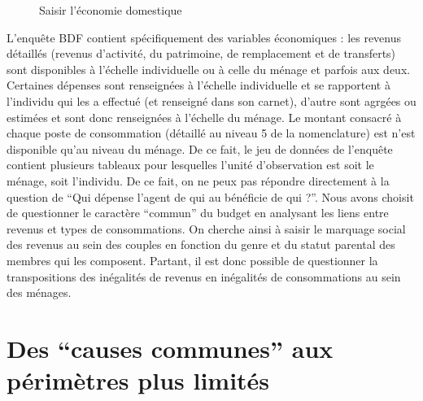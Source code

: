 \documentclass[
  12pt,
]{book}
\begin{document}
\begin{figure}
\begin{tikzpicture}[x=0.75pt,y=0.75pt,yscale=-1,xscale=1]
\end{tikzpicture}

\caption{Saisir l'économie domestique}
\end{figure}

L'enquête BDF contient spécifiquement des variables économiques : les
revenus détaillés (revenus d'activité, du patrimoine, de remplacement et
de transferts) sont disponibles à l'échelle individuelle ou à celle du
ménage et parfois aux deux. Certaines dépenses sont renseignées à
l'échelle individuelle et se rapportent à l'individu qui les a effectué
(et renseigné dans son carnet), d'autre sont agrgées ou estimées et sont
donc renseignées à l'échelle du ménage. Le montant consacré à chaque
poste de consommation (détaillé au niveau 5 de la nomenclature) est
n'est disponible qu'au niveau du ménage. De ce fait, le jeu de données
de l'enquête contient plusieurs tableaux pour lesquelles l'unité
d'observation est soit le ménage, soit l'individu. De ce fait, on ne
peux pas répondre directement à la question de ``Qui dépense l'agent de
qui au bénéficie de qui ?''. Nous avons choisit de questionner le
caractère ``commun'' du budget en analysant les liens entre revenus et
types de consommations. On cherche ainsi à saisir le marquage social des
revenus au sein des couples en fonction du genre et du statut parental
des membres qui les composent. Partant, il est donc possible de
questionner la transpositions des inégalités de revenus en inégalités de
consommations au sein des ménages.

\section{Des ``causes communes'' aux périmètres plus
limités}\label{des-causes-communes-aux-puxe9rimuxe8tres-plus-limituxe9s}
\end{document}
